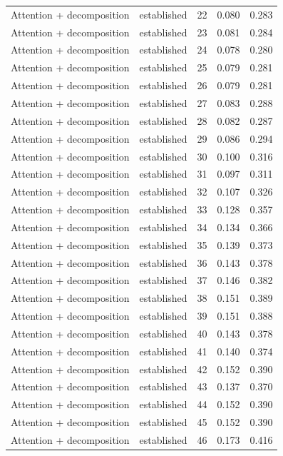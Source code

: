 \begin{tabular}{llrrr}
Attention + decomposition & established & 22 & 0.080 & 0.283 \\
Attention + decomposition & established & 23 & 0.081 & 0.284 \\
Attention + decomposition & established & 24 & 0.078 & 0.280 \\
Attention + decomposition & established & 25 & 0.079 & 0.281 \\
Attention + decomposition & established & 26 & 0.079 & 0.281 \\
Attention + decomposition & established & 27 & 0.083 & 0.288 \\
Attention + decomposition & established & 28 & 0.082 & 0.287 \\
Attention + decomposition & established & 29 & 0.086 & 0.294 \\
Attention + decomposition & established & 30 & 0.100 & 0.316 \\
Attention + decomposition & established & 31 & 0.097 & 0.311 \\
Attention + decomposition & established & 32 & 0.107 & 0.326 \\
Attention + decomposition & established & 33 & 0.128 & 0.357 \\
Attention + decomposition & established & 34 & 0.134 & 0.366 \\
Attention + decomposition & established & 35 & 0.139 & 0.373 \\
Attention + decomposition & established & 36 & 0.143 & 0.378 \\
Attention + decomposition & established & 37 & 0.146 & 0.382 \\
Attention + decomposition & established & 38 & 0.151 & 0.389 \\
Attention + decomposition & established & 39 & 0.151 & 0.388 \\
Attention + decomposition & established & 40 & 0.143 & 0.378 \\
Attention + decomposition & established & 41 & 0.140 & 0.374 \\
Attention + decomposition & established & 42 & 0.152 & 0.390 \\
Attention + decomposition & established & 43 & 0.137 & 0.370 \\
Attention + decomposition & established & 44 & 0.152 & 0.390 \\
Attention + decomposition & established & 45 & 0.152 & 0.390 \\
Attention + decomposition & established & 46 & 0.173 & 0.416 \\

\end{tabular}
